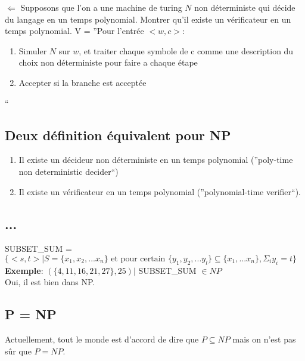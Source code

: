 \documentclass[a4paper,12pt]{article}
\begin{document}
    $\Leftarrow$ Supposons que l'on a une machine de turing $N$ non déterministe qui décide du langage en un temps polynomial.  Montrer qu'il existe un vérificateur en un temps polynomial.  V = ''Pour l'entrée $<w, c>$:
    \begin{enumerate}
     \item Simuler $N$ sur $w$, et traiter chaque symbole de c comme une description du choix non déterministe pour faire a chaque étape
     \item Accepter si la branche est acceptée
    \end{enumerate}``\\
    
  \subsection{Deux définition équivalent pour NP}
    \begin{enumerate}
     \item Il existe un décideur non déterministe en un temps polynomial (''poly-time non deterministic decider``)
     \item Il existe un vérificateur en un temps polynomial (''polynomial-time verifier``).
    \end{enumerate}

  \subsection{...}
    SUBSET\_SUM = $\{<s, t> | S = \{x_1, x_2, ... x_n\} \text{ et pour certain } \{y_1, y_2, ... y_l\} \subseteq \{x_1, ... x_n\}, \Sigma_{i} y_i = t\}$\\
    \textbf{Exemple}: $(\{4, 11, 16, 21, 27\}, 25) | $ SUBSET\_SUM $\in NP$\\
    Oui, il est bien dans NP.
  
  \subsection{P = NP}
    Actuellement, tout le monde est d'accord de dire que $P \subseteq NP$ mais on n'est pas sûr que $P = NP$.
  
  
\end{document}
